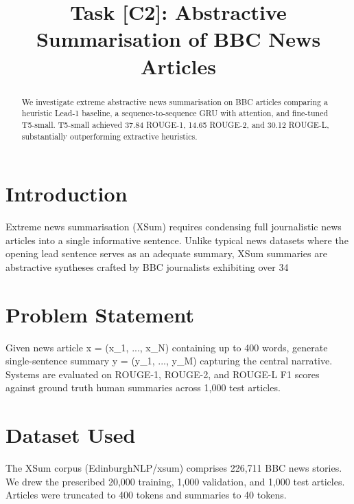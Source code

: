 \documentclass[conference]{IEEEtran}
\begin{document}
\title{Task [C2]: Abstractive Summarisation of BBC News Articles}

\author{
}

\maketitle

\begin{abstract}
We investigate extreme abstractive news summarisation on BBC articles comparing a heuristic Lead-1 baseline, a sequence-to-sequence GRU with attention, and fine-tuned T5-small. T5-small achieved 37.84 ROUGE-1, 14.65 ROUGE-2, and 30.12 ROUGE-L, substantially outperforming extractive heuristics.
\end{abstract}

\section{Introduction}
Extreme news summarisation (XSum) requires condensing full journalistic news articles into a single informative sentence. Unlike typical news datasets where the opening lead sentence serves as an adequate summary, XSum summaries are abstractive syntheses crafted by BBC journalists exhibiting over 34%

\section{Problem Statement}
Given news article x = (x_1, ..., x_N) containing up to 400 words, generate single-sentence summary y = (y_1, ..., y_M) capturing the central narrative. Systems are evaluated on ROUGE-1, ROUGE-2, and ROUGE-L F1 scores against ground truth human summaries across 1,000 test articles.

\section{Dataset Used}
The XSum corpus (EdinburghNLP/xsum) comprises 226,711 BBC news stories. We drew the prescribed 20,000 training, 1,000 validation, and 1,000 test articles. Articles were truncated to 400 tokens and summaries to 40 tokens.
\end{document}
